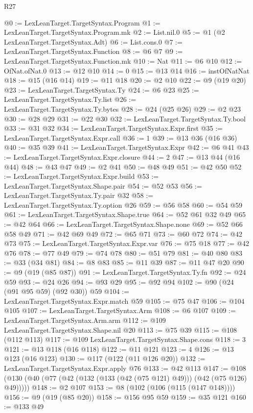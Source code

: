 \begin{lexlean}{R27}
\begin{coremodule}
@0 := LexLeanTarget.TargetSyntax.Program
@1 := LexLeanTarget.TargetSyntax.Program.mk
@2 := List.nil.{0}
@5 := @1 (@2 LexLeanTarget.TargetSyntax.Adt)
@6 := List.cons.{0}
@7 := LexLeanTarget.TargetSyntax.Function
@8 := @6 @7
@9 := LexLeanTarget.TargetSyntax.Function.mk
@10 := Nat
@11 := @6 @10
@12 := OfNat.ofNat.{0}
@13 := @12 @10
@14 := 0
@15 := @13 @14
@16 := instOfNatNat
@18 := @15 (@16 @14)
@19 := @11 @18
@20 := @2 @10
@22 := @9 (@19 @20)
@23 := LexLeanTarget.TargetSyntax.Ty
@24 := @6 @23
@25 := LexLeanTarget.TargetSyntax.Ty.list
@26 := LexLeanTarget.TargetSyntax.Ty.bytes
@28 := @24 (@25 @26)
@29 := @2 @23
@30 := @28 @29
@31 := @22 @30
@32 := LexLeanTarget.TargetSyntax.Ty.bool
@33 := @31 @32
@34 := LexLeanTarget.TargetSyntax.Expr.first
@35 := LexLeanTarget.TargetSyntax.Expr.call
@36 := 1
@39 := @13 @36 (@16 @36)
@40 := @35 @39
@41 := LexLeanTarget.TargetSyntax.Expr
@42 := @6 @41
@43 := LexLeanTarget.TargetSyntax.Expr.closure
@44 := 2
@47 := @13 @44 (@16 @44)
@48 := @43 @47
@49 := @2 @41
@50 := @48 @49
@51 := @42 @50
@52 := LexLeanTarget.TargetSyntax.Expr.build
@53 := LexLeanTarget.TargetSyntax.Shape.pair
@54 := @52 @53
@56 := LexLeanTarget.TargetSyntax.Ty.pair @32
@58 := LexLeanTarget.TargetSyntax.Ty.option @26
@59 := @56 @58
@60 := @54 @59
@61 := LexLeanTarget.TargetSyntax.Shape.true
@64 := @52 @61 @32 @49
@65 := @42 @64
@66 := LexLeanTarget.TargetSyntax.Shape.none
@69 := @52 @66 @58 @49
@71 := @42 @69 @49
@72 := @65 @71
@73 := @60 @72
@74 := @42 @73
@75 := LexLeanTarget.TargetSyntax.Expr.var
@76 := @75 @18
@77 := @42 @76
@78 := @77 @49
@79 := @74 @78
@80 := @51 @79
@81 := @40 @80
@83 := @33 (@34 @81)
@84 := @8 @83
@85 := @11 @39
@87 := @11 @47 @20
@90 := @9 (@19 (@85 @87))
@91 := LexLeanTarget.TargetSyntax.Ty.fn
@92 := @24 @59
@93 := @24 @26
@94 := @93 @29
@95 := @92 @94
@102 := @90 (@24 (@91 @95 @59) (@92 @30)) @59
@104 := LexLeanTarget.TargetSyntax.Expr.match @59
@105 := @75 @47
@106 := @104 @105
@107 := LexLeanTarget.TargetSyntax.Arm
@108 := @6 @107
@109 := LexLeanTarget.TargetSyntax.Arm.arm
@112 := @109 LexLeanTarget.TargetSyntax.Shape.nil @20
@113 := @75 @39
@115 := @108 (@112 @113)
@117 := @109 LexLeanTarget.TargetSyntax.Shape.cons
@118 := 3
@121 := @13 @118 (@16 @118)
@122 := @11 @121
@123 := 4
@126 := @13 @123 (@16 @123)
@130 := @117 (@122 (@11 @126 @20))
@132 := LexLeanTarget.TargetSyntax.Expr.apply @76
@133 := @42 @113
@147 := @108 (@130 (@40 (@77 (@42 (@132 (@133 (@42 (@75 @121) @49))) (@42 (@75 @126) @49)))))
@148 := @2 @107
@153 := @8 (@102 (@106 (@115 (@147 @148))))
@156 := @9 (@19 (@85 @20))
@158 := @156 @95 @59
@159 := @35 @121
@160 := @133 @49

\end{coremodule}
\end{lexlean}
